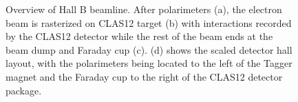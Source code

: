 \begin{figure}[ht]
\begin{minipage}[b]{\linewidth}
        \end{minipage}
        \caption[Hall B Beamline]{Overview of Hall B beamline. After \Moller polarimeters (a), the electron beam is rasterized on CLAS12 target (b) with interactions recorded by the CLAS12 detector while the rest of the beam ends at the beam dump and Faraday cup (c). (d) shows the scaled detector hall layout, with the \Moller polarimeters being located to the left of the Tagger magnet and the Faraday cup to the right of the CLAS12 detector package.}
        \label{fig:allfigures}
    \end{figure}

    \clearpage
